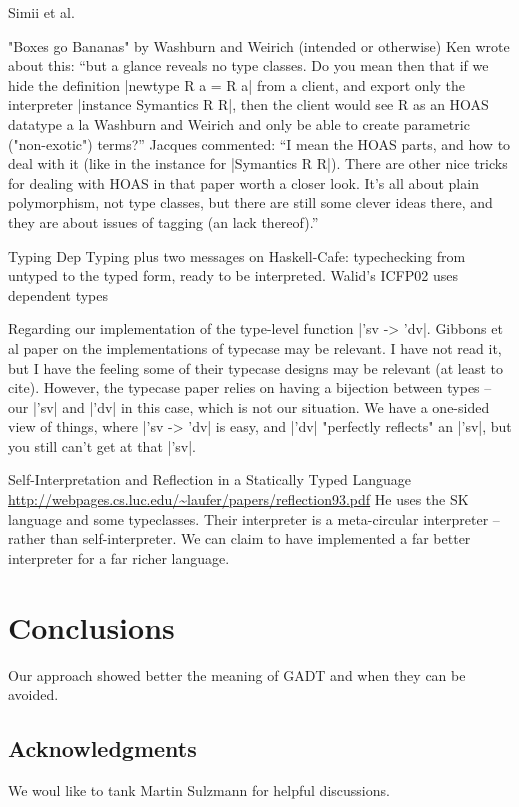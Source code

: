 \documentclass[preprint]{sigplanconf}
\begin{document}
 Simii et al.

"Boxes go Bananas" by Washburn and Weirich (intended or otherwise) Ken
wrote about this: ``but a glance reveals no type classes.  Do you mean
then that if we hide the definition |newtype R a = R a| from a client,
and export only the interpreter |instance Symantics R R|, then the
client would see R as an HOAS datatype a la Washburn and Weirich and
only be able to create parametric ("non-exotic") terms?''  Jacques
commented: ``I mean the HOAS parts, and how to deal with it (like in
the instance for |Symantics R R|).  There are other nice tricks for
dealing with HOAS in that paper worth a closer look.  It's all about
plain polymorphism, not type classes, but there are still some clever
ideas there, and they are about issues of tagging (an lack thereof).''




Typing Dep Typing plus two messages on Haskell-Cafe: typechecking 
from untyped to the typed form, ready to be interpreted. Walid's ICFP02
uses dependent types


Regarding our implementation of the type-level function |'sv -> 'dv|.
Gibbons et al paper on
the implementations of typecase may be relevant. I have not read it,
but I have the feeling some of their typecase designs may be
relevant (at least to cite). 
However, the typecase paper relies on having a 
bijection between types -- our |'sv| and |'dv| in this case, which is not 
our situation.  We have a one-sided view of things, where |'sv -> 'dv| is 
easy, and |'dv| "perfectly reflects" an |'sv|, but you still can't get at 
that |'sv|.


Self-Interpretation and Reflection in a Statically Typed Language 
\url{http://webpages.cs.luc.edu/~laufer/papers/reflection93.pdf}
He uses the SK language and some typeclasses. Their interpreter is a
meta-circular interpreter -- rather than self-interpreter. We can
claim to have implemented a far better interpreter for a far richer
language.

\section{Conclusions}

Our approach showed better the meaning of GADT and when they can be
avoided.

\subsection*{Acknowledgments}
We woul like to tank Martin Sulzmann for helpful discussions.
\end{document}
